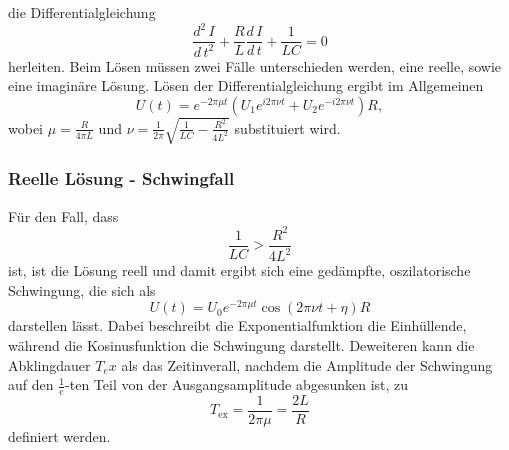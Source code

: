         \\ \\
        die Differentialgleichung 
        \begin{equation}
            \label{eqn:diffgleichung}
            \frac{d^2 \, I}{d \, t^2} + \frac{R}{L} \frac{d \, I}{d \, t} + \frac {1}{L C} = 0
        \end{equation}
        herleiten. Beim Lösen müssen zwei Fälle unterschieden werden, eine reelle, sowie eine imaginäre Lösung. 
        Lösen der Differentialgleichung ergibt im Allgemeinen
        \begin{equation} 
            \label{eqn:strom_allgemein}
            U(t) = e^{-2 \pi \mu t} (U_1 e^{i 2 \pi \nu t} + U_2 e^{-i 2 \pi \nu t}) R,
        \end{equation}
        wobei $\mu = \frac{R}{4 \pi L} $ und $\nu = \frac{1}{2 \pi} \sqrt{\frac{1}{L C} - \frac{R^2}{4 L^2} }$
        substituiert wird.
        \subsubsection{Reelle Lösung - Schwingfall}
            Für den Fall, dass
            \begin{equation}
                \label{eqn:bedingung_reell}
                \frac{1}{L C} > \frac{R^2}{4 L^2}
            \end{equation}
            ist, ist die Lösung reell und damit ergibt sich eine gedämpfte, oszilatorische Schwingung, die sich als
            \begin{equation}
                \label{eqn:reell_lösung}
                U(t) = U_0 e^{-2 \pi \mu t} \cos(2 \pi \nu t + \eta) R
            \end{equation}
            darstellen lässt. Dabei beschreibt die Exponentialfunktion die Einhüllende, während die Kosinusfunktion die Schwingung darstellt.
            Deweiteren kann die Abklingdauer $T_ex$ als das Zeitinverall, nachdem die Amplitude der Schwingung auf den $\frac{1}{e}$-ten Teil
            von der Ausgangsamplitude abgesunken ist, zu
            \begin{equation}
                \label{eqn:abklingdauer}
                T_\text{ex} = \frac{1}{2 \pi \mu} = \frac{2 L}{R}
            \end{equation}
            definiert werden.

